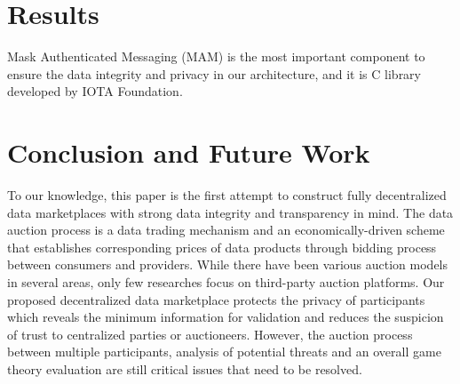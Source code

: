 \documentclass[journal,10pt,a4paper]{IEEEtran}
\begin{document}
\section{Results}
Mask Authenticated Messaging (MAM) is the most important component to ensure the data integrity and privacy in our architecture, and it is C library developed by IOTA Foundation. 




\section{\normalsize\textbf{Conclusion and Future Work}}
To our knowledge, this paper is the first attempt to construct fully decentralized data marketplaces with strong data integrity and transparency in mind.
The data auction process is a data trading mechanism and an economically-driven scheme that establishes corresponding prices of data products through bidding process between consumers and providers. While there have been various auction models\cite{BigPicDataMarket} in several areas, only few researches focus on third-party auction platforms. Our proposed decentralized data marketplace protects the privacy of participants which reveals the minimum information for validation and reduces the suspicion of trust to centralized parties or auctioneers. However, the auction process between multiple participants, analysis of potential threats and an overall game theory evaluation are still critical issues that need to be resolved.




\end{document}
